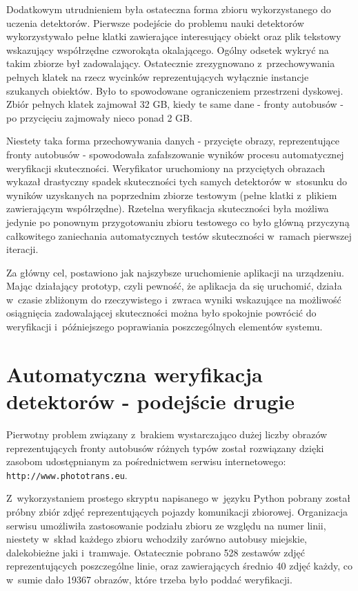 Dodatkowym utrudnieniem była ostateczna forma zbioru wykorzystanego 
do uczenia detektorów. Pierwsze podejście do problemu nauki 
detektorów wykorzystywało pełne klatki zawierające interesujący obiekt
oraz plik tekstowy wskazujący współrzędne czworokąta okalającego.
Ogólny odsetek wykryć na takim zbiorze był zadowalający. 
Ostatecznie zrezygnowano z~przechowywania pełnych klatek na rzecz
wycinków reprezentujących wyłącznie instancje szukanych obiektów.
Było to spowodowane ograniczeniem przestrzeni dyskowej. Zbiór pełnych
klatek zajmował 32 GB, kiedy te same dane - fronty autobusów - po
przycięciu zajmowały nieco ponad 2 GB.

Niestety taka forma przechowywania danych 
- przycięte obrazy, reprezentujące fronty autobusów - spowodowała zafałszowanie 
wyników procesu automatycznej weryfikacji skuteczności.
Weryfikator uruchomiony na przyciętych obrazach wykazał
drastyczny spadek skuteczności tych samych detektorów w~stosunku
do wyników uzyskanych na poprzednim zbiorze testowym (pełne klatki
z~plikiem zawierającym współrzędne).
Rzetelna weryfikacja skuteczności była możliwa jedynie po ponownym przygotowaniu
zbioru testowego co było główną przyczyną 
całkowitego zaniechania automatycznych testów skuteczności
w~ramach pierwszej iteracji.


Za główny cel, postawiono jak najszybsze uruchomienie
aplikacji na urządzeniu. Mając działający prototyp, czyli
pewność, że aplikacja da się uruchomić, działa w~czasie zbliżonym
do rzeczywistego i~zwraca wyniki wskazujące na możliwość
osiągnięcia zadowalającej skuteczności można było spokojnie 
powrócić do weryfikacji i~późniejszego poprawiania
poszczególnych elementów systemu.

\section{Automatyczna weryfikacja detektorów - podejście drugie}

Pierwotny problem związany z~brakiem wystarczająco dużej liczby
obrazów reprezentujących fronty autobusów różnych typów został
rozwiązany dzięki zasobom udostępnianym za pośrednictwem serwisu
internetowego: \verb|http://www.phototrans.eu|.

Z~wykorzystaniem prostego skryptu napisanego w~języku Python pobrany
został próbny zbiór zdjęć reprezentujących pojazdy komunikacji
zbiorowej. Organizacja serwisu umożliwiła zastosowanie
podziału zbioru ze względu na numer linii, niestety
w~skład każdego zbioru wchodziły zarówno autobusy miejskie, dalekobieżne
jaki i~tramwaje. Ostatecznie pobrano 528 zestawów zdjęć reprezentujących
poszczególne linie, oraz zawierających średnio 40 zdjęć każdy, co
w~sumie dało 19367 obrazów, które trzeba było poddać weryfikacji.

